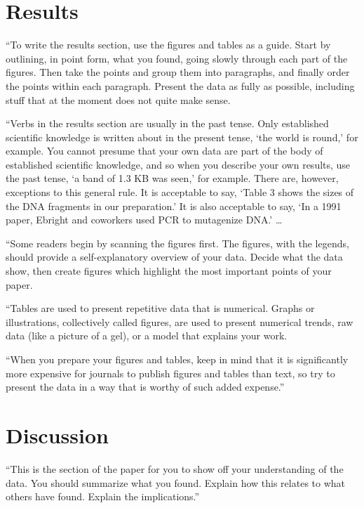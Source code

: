 \documentclass[10pt,twocolumn]{article}
\begin{document}
\section{Results}
\label{sec:results}

``To write the results section, use the figures and tables as a guide. Start by outlining, in point form, what you found, going slowly through each part of the figures. Then take the points and group them into paragraphs, and finally order the points within each paragraph. Present the data as fully as possible, including stuff that at the moment does not quite make sense.

``Verbs in the results section are usually in the past tense. Only established scientific knowledge is written about in the present tense, `the world is round,' for example. You cannot presume that your own data are part of the body of established scientific knowledge, and so when you describe your own results, use the past tense, `a band of 1.3 KB was seen,' for example. There are, however, exceptions to this general rule. It is acceptable to say, `Table 3 shows the sizes of the DNA fragments in our preparation.' It is also acceptable to say, `In a 1991 paper, Ebright and coworkers used PCR to mutagenize DNA.' \ldots

``Some readers begin by scanning the figures first. The figures, with the legends, should provide a self-explanatory overview of your data. Decide what the data show, then create figures which highlight the most important points of your paper.

``Tables are used to present repetitive data that is numerical. Graphs or illustrations, collectively called figures, are used to present numerical trends, raw data (like a picture of a gel), or a model that explains your work.

``When you prepare your figures and tables, keep in mind that it is significantly more expensive for journals to publish figures and tables than text, so try to present the data in a way that is worthy of such added expense.''

\section{Discussion}

``This is the section of the paper for you to show off your understanding of the data. You should summarize what you found. Explain how this relates to what others have found. Explain the implications.''
\end{document}
